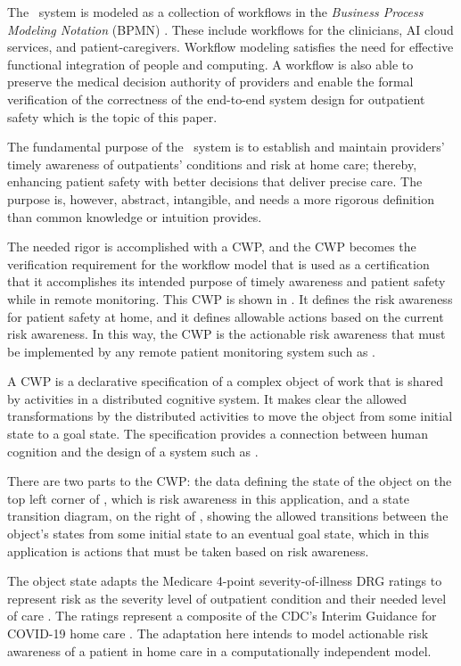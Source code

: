 The \phware\ system is modeled as a collection of workflows in the \emph{Business Process Modeling Notation} (BPMN) \cite{BPMNSpecification}. These include workflows for the clinicians, AI cloud services, and patient-caregivers. Workflow modeling satisfies the need for effective functional integration of people and computing. A workflow is also able to preserve the medical decision authority of providers and enable the formal verification of the correctness of the end-to-end system design for outpatient safety which is the topic of this paper.

The fundamental purpose of the \phware\ system is to establish and maintain providers' timely awareness of outpatients' conditions and risk at home care; thereby, enhancing patient safety with better decisions that deliver precise care. The purpose is, however, abstract, intangible, and needs a more rigorous definition than common knowledge or intuition provides. 

The needed rigor is accomplished with a CWP, and the CWP becomes the verification requirement for the workflow model that is used as a certification that it accomplishes its intended purpose of timely awareness and patient safety while in remote monitoring. This CWP is shown in . It defines the risk awareness for patient safety at home, and it defines allowable actions based on the current risk awareness. In this way, the CWP is the actionable risk awareness that must be implemented by any remote patient monitoring system such as \phware. 

A CWP is a declarative specification of a complex object of work that is shared by activities in a distributed cognitive system. It makes clear the allowed transformations by the distributed activities to move the object from some initial state to a goal state. The specification provides a connection between human cognition and the design of a system such as \phware.

There are two parts to the CWP: the data defining the state of the object on the top left corner of , which is risk awareness in this application, and a state transition diagram, on the right of , showing the allowed transitions between the object's states from some initial state to an eventual goal state, which in this application is actions that must be taken based on risk awareness.

The object state adapts the Medicare 4-point severity-of-illness DRG ratings to represent risk as the severity level of outpatient condition and their needed level of care \cite{severity,Hornbrook2005OverviewOD}. The ratings represent a composite of the CDC’s Interim Guidance for COVID-19 home care \cite{cdc}. The adaptation here intends to model actionable risk awareness of a patient in home care in a computationally independent model. 


